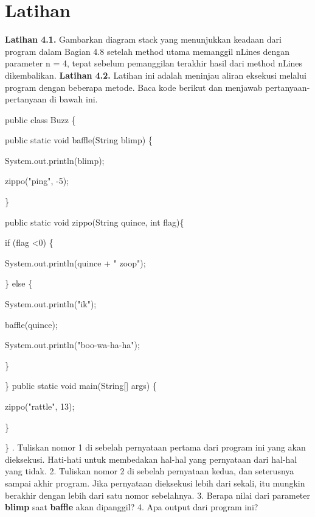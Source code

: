 \section{Latihan}
\textbf{Latihan 4.1.} Gambarkan diagram stack yang menunjukkan keadaan dari program dalam Bagian 4.8 setelah method utama memanggil nLines dengan parameter n = 4, tepat sebelum pemanggilan terakhir hasil dari method nLines dikembalikan.
\newline
\textbf{Latihan 4.2.} Latihan ini adalah meninjau aliran eksekusi melalui program dengan beberapa metode. Baca kode berikut dan menjawab pertanyaan-pertanyaan di bawah ini.
\par
public class Buzz \{
	\par
	public static void baffle(String blimp) \{
		\par
		System.out.println(blimp);
		\par
		zippo("ping", -5);
		\par
	\}
	\newline
	\par
	public static void zippo(String quince, int flag)\{
		\par
		if (flag \textless 0) \{
			\par
			System.out.println(quince + " zoop");
			\par
		\} else \{
		\par
		System.out.println("ik");
		\par
		baffle(quince);
		\par
		System.out.println("boo-wa-ha-ha");
		\par
	\}
			\par
\}
\newline
\newline
public static void main(String[] args) \{
	\par
	zippo("rattle", 13);
	\par
\}
\par
\}
\newline
{}. Tuliskan nomor 1 di sebelah pernyataan pertama dari program ini yang akan dieksekusi. Hati-hati untuk membedakan hal-hal yang pernyataan dari hal-hal yang tidak.
2. Tuliskan nomor 2 di sebelah pernyataan kedua, dan seterusnya sampai akhir program. Jika pernyataan dieksekusi lebih dari sekali, itu mungkin berakhir dengan lebih dari satu nomor sebelahnya.
3. Berapa nilai dari parameter \textbf{blimp} saat \textbf{baffle} akan dipanggil?
4. Apa output dari program ini?
\newline
